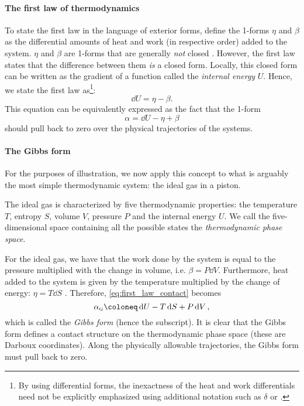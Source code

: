 \paragraph{The first law of thermodynamics} To state the first law in the language of exterior forms, define the 1-forms $\eta$ and $\beta$ as the differential amounts of heat and work (in respective order) added to the system. $\eta$ and $\beta$ are 1-forms that are generally \emph{not} closed \cite{Bamberg1988,Frankel2012}. However, the first law states that the difference between them \emph{is} a closed form. Locally, this closed form  can be written as the gradient of a function called the \emph{internal energy} $U$. Hence, we state the first law as\footnote{By using differential forms, the inexactness of the heat and work differentials need not be explicitly emphasized using additional notation such as $\delta$ or \dj.}:
\begin{equation}
    \dd{U} = \eta - \beta.
    \label{eq:thermo_first_law}
\end{equation}
This equation can be equivalently expressed as the fact that the 1-form
\begin{equation}
    \alpha = \dd{U} - \eta + \beta
    \label{eq:first_law_contact}
\end{equation}
should pull back to zero over the physical trajectories of the systems.

\paragraph{The Gibbs form} For the purposes of illustration, we now apply this concept to what is arguably the most simple thermodynamic system: the ideal gas in a piston. 

The ideal gas is characterized by five thermodynamic properties: the temperature $T$, entropy $S$, volume $V$, pressure $P$ and the internal energy $U$. We call the five-dimensional space containing all the possible states the \emph{thermodynamic phase space}.

For the ideal gas, we have that the work done by the system is equal to the pressure multiplied with the change in volume, i.e. $\beta = P\dd{V}$. Furthermore, heat added to the system is given by the temperature multiplied by the change of energy: $\eta = T\dd{S}$ \cite{Arnold1989b,Wightman1979,Bamberg1988}. Therefore, \cref{eq:first_law_contact} becomes
\begin{equation}
    \alpha_\text{\tiny G} \coloneq \dd{U} - T\dd{S} + P\dd{V},
    \label{eq:gibbs_form}
\end{equation}
which is called the \emph{Gibbs form} (hence the subscript). It is clear that the Gibbs form defines a contact structure on the thermodynamic phase space (these are Darboux coordinates). Along the physically allowable trajectories, the Gibbs form must pull back to zero.

